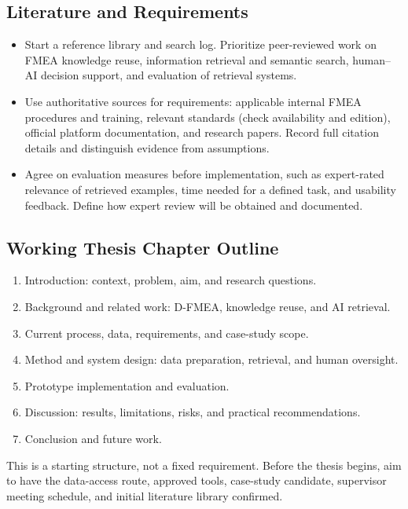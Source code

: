 \subsection*{Literature and Requirements}
\begin{itemize}[nosep, leftmargin=*]
    \item Start a reference library and search log. Prioritize peer-reviewed work on
    FMEA knowledge reuse, information retrieval and semantic search, human--AI
    decision support, and evaluation of retrieval systems.
    \item Use authoritative sources for requirements: applicable internal FMEA
    procedures and training, relevant standards (check availability and edition),
    official platform documentation, and research papers. Record full citation details
    and distinguish evidence from assumptions.
    \item Agree on evaluation measures before implementation, such as expert-rated
    relevance of retrieved examples, time needed for a defined task, and usability
    feedback. Define how expert review will be obtained and documented.
\end{itemize}

\subsection*{Working Thesis Chapter Outline}
\begin{enumerate}[nosep, leftmargin=*]
    \item Introduction: context, problem, aim, and research questions.
    \item Background and related work: D-FMEA, knowledge reuse, and AI retrieval.
    \item Current process, data, requirements, and case-study scope.
    \item Method and system design: data preparation, retrieval, and human oversight.
    \item Prototype implementation and evaluation.
    \item Discussion: results, limitations, risks, and practical recommendations.
    \item Conclusion and future work.
\end{enumerate}

This is a starting structure, not a fixed requirement. Before the thesis begins, aim
to have the data-access route, approved tools, case-study candidate, supervisor
meeting schedule, and initial literature library confirmed.
